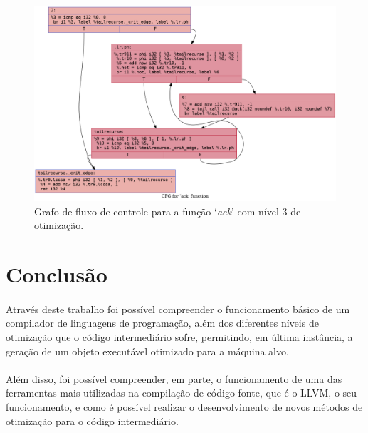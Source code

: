 \documentclass[12pt]{article}
\begin{document}
\begin{figure}
    \centering
    \includegraphics[width=0.5\linewidth]{recursive_.ack_O3.png}
    \caption{Grafo de fluxo de controle para a função ‘\textit{ack}’ com nível 3 de otimização.}
\end{figure}

\FloatBarrier

\section{Conclusão}

\paragraph{}Através deste trabalho foi possível compreender o funcionamento básico de um compilador de linguagens de programação, além dos diferentes níveis de otimização que o código intermediário sofre, permitindo, em última instância, a geração de um objeto executável otimizado para a máquina alvo.

\paragraph{}Além disso, foi possível compreender, em parte, o funcionamento de uma das ferramentas mais utilizadas na compilação de código fonte, que é o LLVM, o seu funcionamento, e como é possível realizar o desenvolvimento de novos métodos de otimização para o código intermediário.
\end{document}
